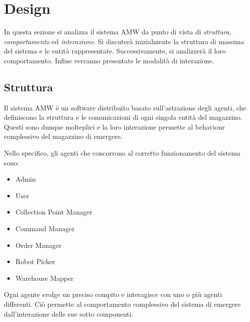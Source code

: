 \section{Design}



In questa sezione si analizza il sistema AMW da punto di vista di \textit{struttura}, \textit{comportamento} ed \textit{interazione}.
Si discuterà inizialmente la struttura di massima del sistema e le entità rappresentate. Successivamente, si analizzerà il loro comportamento. Infine verranno presentate le modalità di interazione.

\subsection{Struttura}

Il sistema AMW è un software distribuito basato sull'astrazione degli agenti, che definiscono la struttura e le comunicazioni di ogni singola entità del magazzino. Questi sono dunque molteplici e la loro interazione permette al behaviour complessivo del magazzino di emergere.

Nello specifico, gli agenti che concorrono al corretto funzionamento del sistema sono:
\begin{itemize}
    \item Admin
    \item User
    \item Collection Point Manager
    \item Command Manager
    \item Order Manager
    \item Robot Picker
    \item Warehouse Mapper
\end{itemize}
Ogni agente svolge un preciso compito e interagisce con uno o più agenti differenti. Ciò permette al comportamento complessivo del sistema di emergere dall'interazione delle sue sotto componenti.

